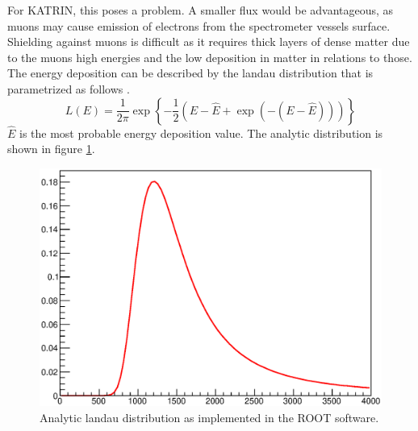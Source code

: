     For KATRIN, this poses a problem. A smaller flux would be advantageous, as muons may cause emission of electrons from the spectrometer vessels surface. Shielding against muons is difficult as it requires thick layers of dense matter due to the muons high energies and the low deposition in matter in relations to those.
    The energy deposition can be described by the landau distribution that is parametrized as follows \cite{Grupen}.
    \begin{equation}
    	L(E) = \frac{1}{2\pi}\exp{\left\{-\frac{1}{2}\left(E-\hat E + \exp \left(-(E-\hat E)\right)\right)\right\}}
    \end{equation}
	$\hat E$ is the most probable energy deposition value. The analytic distribution is shown in figure \ref{fig:Introduction:landauDistribution}.
	\begin{figure}
	\centering
		\includegraphics[width = 0.9 \textwidth]{graphics/cosmicRays/TMathLandauRoot.eps}
		\caption[Landau distribution]{Analytic landau distribution as implemented in the ROOT software.}
		\label{fig:Introduction:landauDistribution}
	\end{figure}

    
   